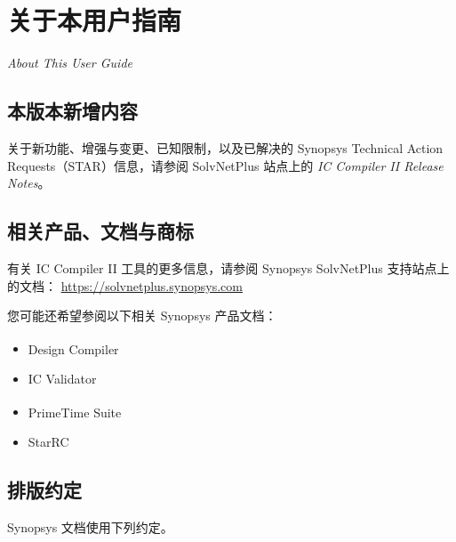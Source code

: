 \chapter*{关于本用户指南}

\noindent\textit{About This User Guide}

\section*{本版本新增内容}

关于新功能、增强与变更、已知限制，以及已解决的 Synopsys Technical Action Requests（STAR）信息，请参阅 SolvNetPlus 站点上的
\textit{IC Compiler II Release Notes}。

\section*{相关产品、文档与商标}

有关 IC Compiler II 工具的更多信息，请参阅 Synopsys SolvNetPlus 支持站点上的文档：
\url{https://solvnetplus.synopsys.com}

您可能还希望参阅以下相关 Synopsys 产品文档：
\begin{itemize}
  \item Design Compiler\textsuperscript{\textregistered}
  \item IC Validator
  \item PrimeTime Suite\textsuperscript{\textregistered}
  \item StarRC\texttrademark
\end{itemize}

\section*{排版约定}

Synopsys 文档使用下列约定。

